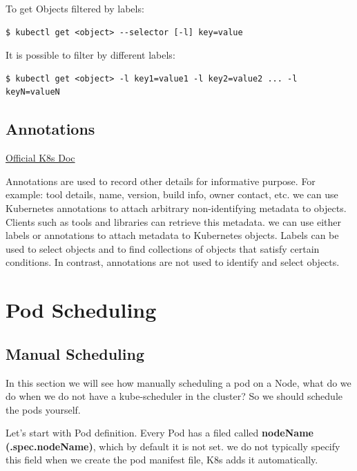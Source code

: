 \documentclass{article}
\newenvironment{codetemplate}[1][]{%
  \mybasecolorbox[#1]
  \itshape
}{%
  \endmybasecolorbox
}
\begin{document}
To get Objects filtered by labels:
\begin{codetemplate}{}
\begin{verbatim}
$ kubectl get <object> --selector [-l] key=value
\end{verbatim}
\end{codetemplate}

It is possible to filter by different labels:
\begin{codetemplate}{}
\begin{verbatim}
$ kubectl get <object> -l key1=value1 -l key2=value2 ... -l keyN=valueN
\end{verbatim}
\end{codetemplate}

\subsection{Annotations}

\href{https://kubernetes.io/docs/concepts/overview/working-with-objects/annotations/}{Official K8s Doc}

Annotations are used to record other details for informative purpose. For example: tool details, name, version, build info, owner contact, etc. we can use Kubernetes annotations to attach arbitrary non-identifying metadata to objects. Clients such as tools and libraries can retrieve this metadata. we can use either labels or annotations to attach metadata to Kubernetes objects. Labels can be used to select objects and to find collections of objects that satisfy certain conditions. In contrast, annotations are not used to identify and select objects.

\newpage
\section{Pod Scheduling}

\subsection{Manual Scheduling}

In this section we will see how manually scheduling a pod on a Node, what do we do when we do not have a kube-scheduler in the cluster? So we should schedule the pods yourself.

Let's start with Pod definition. Every Pod has a filed called \textbf{nodeName (.spec.nodeName)}, which by default it is not set. we do not typically specify this field when we create the pod manifest file, K8s adds it automatically. 
\end{document}
